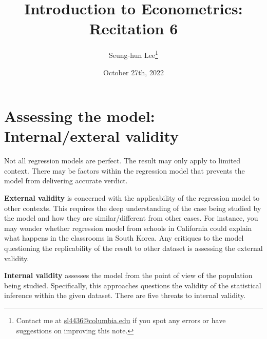 \documentclass[12pt]{article}
\title{Introduction to Econometrics: Recitation 6}
\theoremstyle{definition}
\theoremstyle{property}
\theoremstyle{assumption}
\theoremstyle{example}
\theoremstyle{comment}
\begin{document}
\linespread{1.25}
\onehalfspacing

\author{Seung-hun Lee\footnote{Contact me at \href{mailto:sl4436@columbia.edu}{sl4436@columbia.edu} if you spot any errors or have suggestions on improving this note.}}
\date{October 27th, 2022}
\maketitle
\thispagestyle{firstpage}




\section{Assessing the model: Internal/exteral validity}
Not all regression models are perfect. The result may only apply to limited context. There may be factors within the regression model that prevents the model from delivering accurate verdict. \par\medskip
\textbf{External validity} is concerned with the applicability of the regression model to other contexts. This requires the deep understanding of the case being studied by the model and how they are similar/different from other cases. For instance, you may wonder whether regression model from schools in California could explain what happens in the classrooms in South Korea. Any critiques to the model questioning the replicability of the result to other dataset is assessing the external validity. \par\medskip
\textbf{Internal validity} assesses the model from the point of view of the population being studied. Specifically, this approaches questions the validity of the statistical inference within the given dataset. There are five threats to internal validity.
\end{document}
